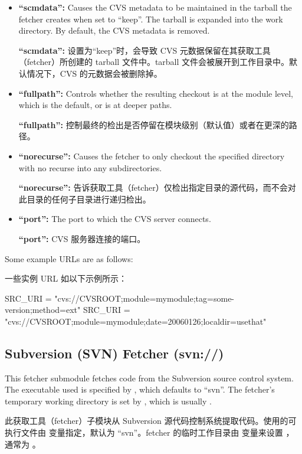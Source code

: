 \begin{itemize}
\item \textbf{``scmdata'':} Causes the CVS metadata to be maintained in the tarball the fetcher creates when set to ``keep''. The tarball is expanded into the work directory. By default, the CVS metadata is removed.

\medskip
\textbf{``scmdata'':} 设置为“keep”时，会导致 CVS 元数据保留在其获取工具（fetcher）所创建的 tarball 文件中。tarball 文件会被展开到工作目录中。默认情况下，CVS 的元数据会被删除掉。

\item \textbf{``fullpath'':} Controls whether the resulting checkout is at the module level, which is the default, or is at deeper paths.

\medskip
\textbf{``fullpath'':} 控制最终的检出是否停留在模块级别（默认值）或者在更深的路径。

\item \textbf{``norecurse'':} Causes the fetcher to only checkout the specified directory with no recurse into any subdirectories.

\medskip
\textbf{``norecurse'':} 告诉获取工具（fetcher）仅检出指定目录的源代码，而不会对此目录的任何子目录进行递归检出。

\item \textbf{``port'':} The port to which the CVS server connects.

\medskip
\textbf{``port'':} CVS 服务器连接的端口。
\end{itemize}
Some example URLs are as follows:

\medskip
一些实例 URL 如以下示例所示：

\medskip
\begin{pyglist}
SRC_URI = "cvs://CVSROOT;module=mymodule;tag=some-version;method=ext"
SRC_URI = "cvs://CVSROOT;module=mymodule;date=20060126;localdir=usethat"
\end{pyglist}

\subsection{Subversion (SVN) Fetcher (svn://)}

This fetcher submodule fetches code from the Subversion source control system. The executable used is specified by , which defaults to ``svn''. The fetcher's temporary working directory is set by , which is usually .

此获取工具（fetcher）子模块从 Subversion 源代码控制系统提取代码。使用的可执行文件由  变量指定，默认为 ``svn''。fetcher 的临时工作目录由  变量来设置 ，通常为 。

